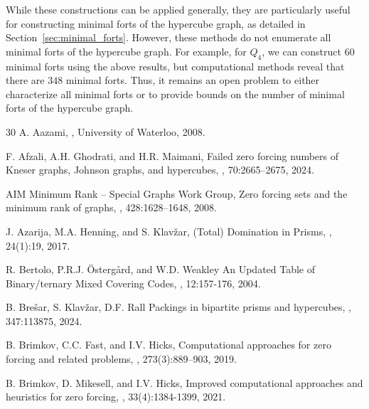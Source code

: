 \documentclass[twoside, 12pt]{article}
\theoremstyle{definition}
\begin{document}
While these constructions can be applied generally, they are particularly useful for constructing minimal forts of the hypercube graph, as detailed in Section~\ref{sec:minimal_forts}. However, these methods do not enumerate all minimal forts of the hypercube graph. For example, for $Q_{4}$, we can construct $60$ minimal forts using the above results, but computational methods reveal that there are $348$ minimal forts. Thus, it remains an open problem to either characterize all minimal forts or to provide bounds on the number of minimal forts of the hypercube graph.
\begin{thebibliography}{30}
{\sc A. Aazami},
,
\newblock University of Waterloo, 2008. 

{\sc F. Afzali, A.H. Ghodrati, and H.R. Maimani},
\newblock Failed zero forcing numbers of Kneser graphs, Johnson graphs, and hypercubes,
, 70:2665--2675, 2024.

{\sc AIM Minimum Rank – Special Graphs Work Group},
\newblock Zero forcing sets and the minimum rank of graphs,
, 428:1628--1648, 2008.

{\sc J. Azarija, M.A. Henning, and S. Klav\v zar},
\newblock (Total) Domination in Prisms,
, 24(1):19, 2017.

{\sc R. Bertolo,  P.R.J. \" Osterg\aa rd, and W.D. Weakley}
\newblock An Updated Table of Binary/ternary Mixed Covering Codes,
, 12:157-176, 2004.

{\sc B. Bre\v sar, S. Klav\v zar, D.F. Rall}
\newblock Packings in bipartite prisms and hypercubes,
, 347:113875, 2024.

{\sc B. Brimkov, C.C. Fast, and I.V. Hicks},
\newblock Computational approaches for zero forcing
and related problems,
, 273(3):889--903, 2019.

{\sc B. Brimkov, D. Mikesell, and I.V. Hicks},
\newblock Improved computational approaches and heuristics for zero forcing,
, 33(4):1384-1399, 2021.


\end{thebibliography}
\end{document}
